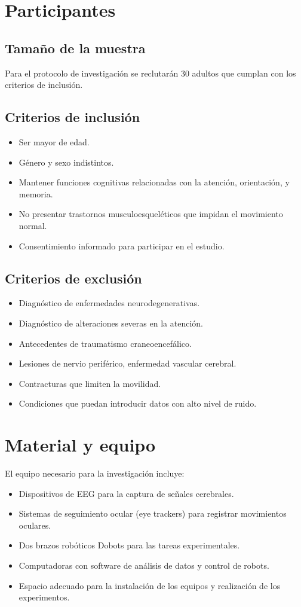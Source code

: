 \documentclass[12pt]{article}
\begin{document}
\section{Participantes}

\subsection{Tamaño de la muestra}
Para el protocolo de investigación se reclutarán 30 adultos que cumplan con los criterios de inclusión.

\subsection{Criterios de inclusión}
\begin{itemize}
    \item Ser mayor de edad.
    \item Género y sexo indistintos.
    \item Mantener funciones cognitivas relacionadas con la atención, orientación, y memoria.
    \item No presentar trastornos musculoesqueléticos que impidan el movimiento normal.
    \item Consentimiento informado para participar en el estudio.
\end{itemize}

\subsection{Criterios de exclusión}
\begin{itemize}
    \item Diagnóstico de enfermedades neurodegenerativas.
    \item Diagnóstico de alteraciones severas en la atención.
    \item Antecedentes de traumatismo craneoencefálico.
    \item Lesiones de nervio periférico, enfermedad vascular cerebral.
    \item Contracturas que limiten la movilidad.
    \item Condiciones que puedan introducir datos con alto nivel de ruido.
\end{itemize}

\section{Material y equipo}
El equipo necesario para la investigación incluye:
\begin{itemize}
    \item Dispositivos de EEG para la captura de señales cerebrales.
    \item Sistemas de seguimiento ocular (eye trackers) para registrar movimientos oculares.
    \item Dos brazos robóticos Dobots para las tareas experimentales.
    \item Computadoras con software de análisis de datos y control de robots.
    \item Espacio adecuado para la instalación de los equipos y realización de los experimentos.
\end{itemize}
\end{document}
